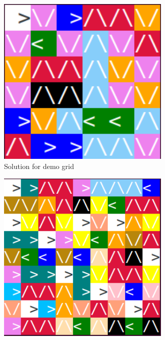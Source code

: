 \documentclass{scrartcl}
\begin{document}
	\begin{figure}
		\begin{subfigure}{0.5\textwidth}
			\includegraphics[width=0.9\textwidth]{resources/Screenshot from 2022-11-21 12-14-49.png}
			\caption{Solution for demo grid}
			\label{robot-demogrid-solution}
		\end{subfigure}
		\begin{subfigure}{0.5\textwidth}
			\includegraphics[width=0.9\textwidth]{resources/Screenshot from 2022-11-21 12-20-11.png}

\end{subfigure}
\end{figure}
\end{document}
